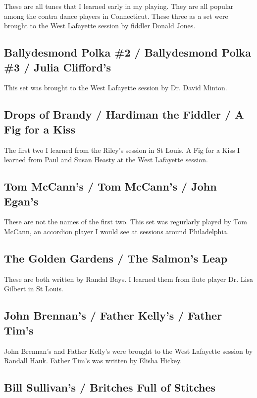 \documentclass[11pt,letterpaper]{article}
\begin{document}
These are all tunes that I learned early in my playing. They are all popular among the contra dance players in Connecticut. These three as a set were brought to the West Lafayette session by fiddler Donald Jones. 

\subsection{Ballydesmond Polka \#2 / Ballydesmond Polka \#3 / Julia Clifford's} 

This set was brought to the West Lafayette session by Dr. David Minton.

\subsection{Drops of Brandy / Hardiman the Fiddler / A Fig for a Kiss} 

The first two I learned from the Riley's session in St Louis. A Fig for a Kiss I learned from Paul and Susan Heasty at the West Lafayette session.

\subsection{Tom McCann's / Tom McCann's / John Egan's} 

These are not the names of the first two. This set was regurlarly played by Tom McCann, an accordion player I would see at sessions around Philadelphia. 

\subsection{The Golden Gardens / The Salmon's Leap} 

These are both written by Randal Bays. I learned them from flute player Dr. Lisa Gilbert in St Louis.

\subsection{John Brennan's / Father Kelly's / Father Tim's} 

John Brennan's and Father Kelly's were brought to the West Lafayette session by Randall Hauk. Father Tim's was written by Elisha Hickey.

\subsection{Bill Sullivan's / Britches Full of Stitches} 
\end{document}

